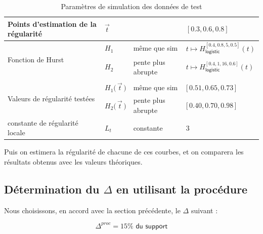 \begin{table}[H]
\begin{tabularx}{\textwidth}{XXXX}
		\midrule
		Points d'estimation de la régularité                & $\vec t$                        &                    & $[0.3, 0.6, 0.8]$                                         \\
		\midrule
		\multirow{2}{\hsize}{Fonction de Hurst}             & $H_1$                           & même que sim       & $t \mapsto H^{[0.4, 0.8, 5, 0.5]}_{\textsf{logistic}}(t)$ \\
		                                                    & $H_2$                           & pente plus abrupte & $t \mapsto H^{[0.4, 1, 16, 0.6]}_{\textsf{logistic}}(t)$  \\
		\\
		\multirow{2}{\hsize}{Valeurs de régularité testées} & $H_1\bigl( \, \vec t \, \bigr)$ & même que sim       & $\bigl[ \, 0.51, 0.65, 0.73 \, \bigr]$                    \\
		                                                    & $H_2\bigl( \, \vec t \, \bigr)$ & pente plus abrupte & $\bigl[ \, 0.40, 0.70, 0.98 \, \bigr]$                    \\
		\midrule
		constante de régularité locale                      & $L_t$                           & constante          & 3                                                         \\
		\bottomrule
	\end{tabularx}
	\caption{Paramètres de simulation des données de test}
	\label{tab:sim_test_params}
\end{table}

\noindent Puis on estimera la régularité de chacune de ces courbes, et on comparera les résultats obtenus avec les valeurs théoriques.

\subsection{Détermination du $\Delta$ en utilisant la procédure}

Nous choisissons, en accord avec la section précédente, le $\Delta$ suivant :

\begin{equation*}
	\Delta^{proc} = 15\% \textsf{ du support}
\end{equation*}


